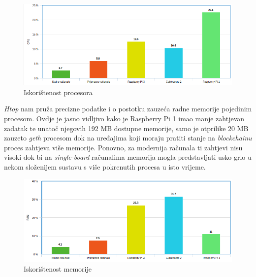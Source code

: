 \documentclass[times, utf8, zavrsni, numeric]{fer}
\begin{document}
\begin{figure}[ht]
  \caption{Iskorištenost procesora}
  \centering
  \includegraphics[width=\textwidth]{cpuUtil.png}
\end{figure}

\emph{Htop} nam pruža precizne podatke i o postotku zauzeća radne memorije pojedinim procesom. Ovdje je jasno vidljivo kako je Raspberry Pi 1 imao manje zahtjevan
zadatak te unatoč njegovih 192 MB dostupne memorije, samo je otprilike 20 MB zauzeto \emph{geth} procesom dok na uređajima koji moraju pratiti stanje na \emph{blockchainu}
proces zahtjeva više memorije. Ponovno, za modernija računala ti zahtjevi nisu visoki dok bi na \emph{single-board} računalima memorija mogla predstavljati usko grlo
u nekom složenijem sustavu s više pokrenutih procesa u isto vrijeme.

\begin{figure}[ht]
  \caption{Iskorištenost memorije}
  \centering
  \includegraphics[width=\textwidth]{ramUtil.png}
\end{figure}
\end{document}
